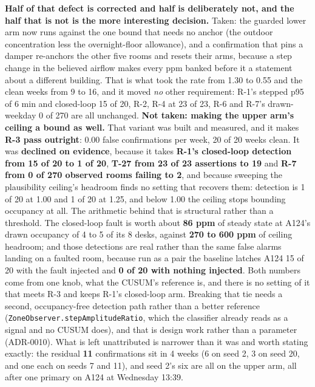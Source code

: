 \textbf{Half of that defect is corrected and half is deliberately not, and the half that is not is
the more interesting decision.} Taken: the guarded lower arm now runs against the one bound that
needs no anchor (the outdoor concentration less the overnight-floor allowance), and a confirmation
that pins a damper re-anchors the other five rooms and resets their arms, because a step change in
the believed airflow makes every ppm banked before it a statement about a different building. That
is what took the rate from 1.30 to 0.55 and the clean weeks from 9 to 16, and it moved \emph{no}
other requirement: R-1's stepped p95 of 6 min and closed-loop 15 of 20, R-2, R-4 at 23 of 23, R-6
and R-7's drawn-weekday 0 of 270 are all unchanged. \textbf{Not taken: making the upper arm's ceiling a bound as
well.} That variant was built and measured, and it makes \textbf{R-3 pass outright}: 0.00 false
confirmations per week, 20 of 20 weeks clean. It was \textbf{declined on evidence}, because it
takes \textbf{R-1's closed-loop detection from 15 of 20 to 1 of 20}, \textbf{T-27 from 23 of 23
assertions to 19} and \textbf{R-7 from 0 of 270 observed rooms failing to 2}, and because sweeping
the plausibility ceiling's headroom finds no setting that recovers them: detection is 1 of 20 at
1.00 and 1 of 20 at 1.25, and below 1.00 the ceiling stops bounding occupancy at all. The
arithmetic behind that is structural rather than a threshold. The closed-loop fault is worth about
\textbf{86 ppm} of steady state at A124's drawn occupancy of 4 to 5 of its 8 desks, against
\textbf{270 to 600 ppm} of ceiling headroom; and those detections are real rather than the same
false alarms landing on a faulted room, because run as a pair the baseline latches A124 15 of 20
with the fault injected and \textbf{0 of 20 with nothing injected}. Both numbers come from one
knob, what the CUSUM's reference is, and there is no setting of it that meets R-3 and keeps R-1's
closed-loop arm. Breaking that tie needs a second, occupancy-free detection path rather than a
better reference (\texttt{ZoneObserver.stepAmplitudeRatio}, which the classifier already reads as
a signal and no CUSUM does), and that is design work rather than a parameter (ADR-0010). What is
left unattributed is narrower than it was and worth stating exactly: the residual \textbf{11}
confirmations sit in 4 weeks (6 on seed 2, 3 on seed 20, and one each on seeds 7 and 11), and seed
2's six are all on the upper arm, all after one primary on A124 at Wednesday 13:39.

